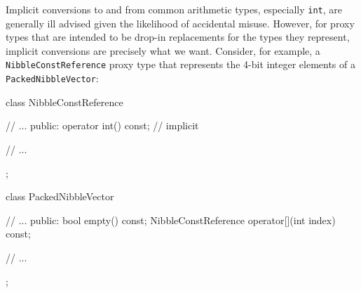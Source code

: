 Implicit conversions to and from common arithmetic types, especially
\lstinline!int!, are generally ill advised given the likelihood of
accidental misuse. 
%
However, for proxy types that are intended to be drop-in replacements for the types they represent, implicit conversions are precisely what we want. Consider, for example, a \lstinline!NibbleConstReference!
 proxy type that represents the 4-bit integer elements of a \lstinline!PackedNibbleVector!:


\begin{emcppslisting}[emcppsbatch=e3]
class NibbleConstReference
{
    // ...
public:
    operator int() const; // implicit

    // ...
};

class PackedNibbleVector 
{
    // ...
public:
    bool empty() const;
    NibbleConstReference operator[](int index) const;
    
    // ...
};
\end{emcppslisting}


